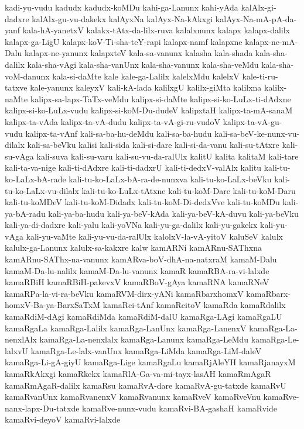 {kadi-yu-vudu
kadudx
kadudx-koMDu
kahi-ga-Lanunx
kahi-yAda
kalAlx-gi-dadxre
kalAlx-gu-vu-dakekx
kalAyxNa
kalAyx-Na-kAkxgi
kalAyx-Na-mA-pA-da-yanf
kala-hA-yanetxV
kalakx-tAtx-da-lilx-ruva
kalalxnunx
kalapx
kalapx-dalilx
kalapx-ga-LigU
kalapx-koV-Ti-sha-teY-rapi
kalapx-namf
kalapxne
kalapx-ne-mA-Dalu
kalapx-ne-yanunx
kalapxteV
kala-sa-vanunx
kalasha
kala-shada
kala-sha-dalilx
kala-sha-vAgi
kala-sha-vanUnx
kala-sha-vanunx
kala-sha-veMdu
kala-sha-voM-danunx
kala-si-daMte
kale
kale-ga-Lalilx
kalelxMdu
kalelxV
kale-ti-ru-tatxve
kale-yanunx
kaleyxV
kali-kA-lada
kalilxgU
kalilx-giMta
kalilxna
kalilx-naMte
kalipx-sa-lapx-TaTx-veMdu
kalipx-si-daMte
kalipx-si-ko-LuLx-ti-dAdxne
kalipx-si-ko-LuLx-vudu
kalipx-si-koM-Du-dudeV
kalipxtaH
kalipx-ta-mA-sanaM
kalipx-ta-vAda
kalipx-ta-vA-dudu
kalipx-ta-vA-gi-ru-vudoV
kalipx-ta-vA-gu-vudu
kalipx-ta-vAnf
kali-sa-ba-hu-deMdu
kali-sa-ba-hudu
kali-sa-beV-ke-nunx-vu-dilalx
kali-sa-beVku
kalisi
kali-sida
kali-si-dare
kali-si-da-vanu
kali-su-tAtxre
kali-su-vAga
kali-suva
kali-su-varu
kali-su-vu-da-ralUlx
kalitU
kalita
kalitaM
kali-tare
kali-ta-va-nige
kali-ti-dAdxre
kali-ti-dadxrU
kali-ti-dedxV-valAlx
kalitu
kali-tu-ko-LaLx-bA-rade
kali-tu-ko-LaLx-bA-ra-de-nunxva
kali-tu-ko-LaLx-beVku
kali-tu-ko-LaLx-vu-dilalx
kali-tu-ko-LuLx-tAtxne
kali-tu-koM-Dare
kali-tu-koM-Daru
kali-tu-koMDeV
kali-tu-koM-Didadx
kali-tu-koM-Di-dedxVve
kali-tu-koMDu
kali-ya-bA-radu
kali-ya-ba-hudu
kali-ya-beV-kAda
kali-ya-beV-kA-duvu
kali-ya-beVku
kali-ya-di-dadxre
kali-yalu
kali-yoVNa
kali-yu-ga-dalilx
kali-yu-gakekx
kali-yu-vAga
kali-yu-vaMte
kali-yu-vu-da-ralUlx
kalolxV-la-vA-yitoV
kaluSeV
kalulx
kalulx-ga-Lanunx
kalulx-sa-kakxre
kalw
kamARNi
kamARnu-SAThxna
kamARnu-SAThx-na-vanunx
kamARva-boV-dhA-na-natxraM
kamaM-Dalu
kamaM-Da-lu-nalilx
kamaM-Da-lu-vanunx
kamaR
kamaRBA-ra-vi-lalxde
kamaRBiH
kamaRBiH-pakevxV
kamaRBoV-gAya
kamaRNA
kamaRNeV
kamaRPa-la-vi-ra-beVku
kamaRVM-dirx-yANi
kamaRbarxhomxV
kamaRbarx-homxV-Ba-ya-BarxSaTxM
kamaRci-tAnf
kamaRcitoV
kamaRda
kamaRdalilx
kamaRdiM-dAgi
kamaRdiMda
kamaRdiM-dalU
kamaRga-LAgi
kamaRgaLU
kamaRgaLa
kamaRga-Lalilx
kamaRga-LanUnx
kamaRga-LanenxV
kamaRga-La-nenxlAlx
kamaRga-La-nenxlalx
kamaRga-Lanunx
kamaRga-LeMdu
kamaRga-Le-lalxvU
kamaRga-Le-lalx-vanUnx
kamaRga-LiMda
kamaRga-LiM-daleV
kamaRga-Li-gA-giyU
kamaRga-Lige
kamaRgaLu
kamaRjAleYH
kamaRjanayxM
kamaRkAkxgi
kamaRkekx
kamaRlA-Ga-va-mi-tayx-lasAH
kamaRmAgaR
kamaRmAgaR-dalilx
kamaRsu
kamaRvA-dare
kamaRvA-gu-tatxde
kamaRvU
kamaRvanUnx
kamaRvanenxV
kamaRvanunx
kamaRveV
kamaRveVnu
kamaRve-nanx-lapx-Du-tatxde
kamaRve-nunx-vudu
kamaRvi-BA-gashaH
kamaRvide
kamaRvi-deyoV
kamaRvi-lalxde
}
